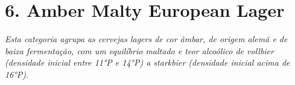 \section*{6. Amber Malty European Lager}
\textit{Esta categoria agrupa as cervejas lagers de cor âmbar, de origem alemã e de baixa fermentação, com um equilíbrio maltado e teor alcoólico de vollbier (densidade inicial entre 11°P e 14°P) a starkbier (densidade inicial acima de 16°P).}
